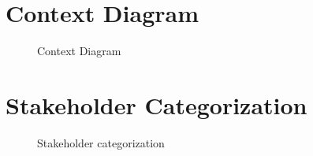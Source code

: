 \appendix
\section{Context Diagram}
\begin{figure}[!h]
	\vspace{1cm}
	\centering
	\setlength\fboxsep{7pt}
	\setlength\fboxrule{0.5pt}
	\label{appendix_a_context_diagram}
	\caption{Context Diagram}
\end{figure}
\clearpage
\section{Stakeholder Categorization}
\begin{figure}[!h]
	\vspace{1cm}
	\centering
	\setlength\fboxsep{7pt}
	\setlength\fboxrule{0.5pt}
	\label{appendix_b_stakeholder_categorization}
	\caption{Stakeholder categorization}
\end{figure}
